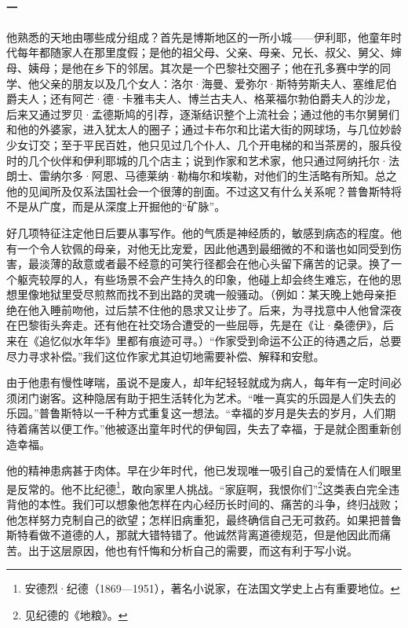 \paragraph*{一}
\par 他熟悉的天地由哪些成分组成？首先是博斯地区的一所小城——伊利耶，他童年时代每年都随家人在那里度假；是他的祖父母、父亲、母亲、兄长、叔父、舅父、婶母、姨母；是他在乡下的邻居。其次是一个巴黎社交圈子；他在孔多赛中学的同学、他父亲的朋友以及几个女人：洛尔·海曼、爱弥尔·斯特劳斯夫人、塞维尼伯爵夫人；还有阿芒·德·卡雅韦夫人、博兰古夫人、格莱福尔勃伯爵夫人的沙龙，后来又通过罗贝·孟德斯鸠的引荐，逐渐结识整个上流社会；通过他的韦尔舅舅们和他的外婆家，进入犹太人的圈子；通过卡布尔和比诺大街的网球场，与几位妙龄少女订交；至于平民百姓，他只见过几个仆人、几个开电梯的和当茶房的，服兵役时的几个伙伴和伊利耶城的几个店主；说到作家和艺术家，他只通过阿纳托尔·法朗士、雷纳尔多·阿恩、马德莱纳·勒梅尔和埃勒，对他们的生活略有所知。总之他的见闻所及仅系法国社会一个很薄的剖面。不过这又有什么关系呢？普鲁斯特将不是从广度，而是从深度上开掘他的“矿脉”。
\par 好几项特征注定他日后要从事写作。他的气质是神经质的，敏感到病态的程度。他有一个令人钦佩的母亲，对他无比宠爱，因此他遇到最细微的不和谐也如同受到伤害，最淡薄的敌意或者最不经意的可笑行径都会在他心头留下痛苦的记录。换了一个躯壳较厚的人，有些场景不会产生持久的印象，他碰上却会终生难忘，在他的思想里像地狱里受尽煎熬而找不到出路的灵魂一般骚动。（例如：某天晚上她母亲拒绝在他入睡前吻他，过后禁不住他的恳求又让步了。后来，为寻找意中人他曾深夜在巴黎街头奔走。还有他在社交场合遭受的一些屈辱，先是在《让·桑德伊》，后来在《追忆似水年华》里都有痕迹可寻。）“作家受到命运不公正的待遇之后，总要尽力寻求补偿。”我们这位作家尤其迫切地需要补偿、解释和安慰。
\par 由于他患有慢性哮喘，虽说不是废人，却年纪轻轻就成为病人，每年有一定时间必须闭门谢客。这种隐居有助于把生活转化为艺术。“唯一真实的乐园是人们失去的乐园。”普鲁斯特以一千种方式重复这一想法。“幸福的岁月是失去的岁月，人们期待着痛苦以便工作。”他被逐出童年时代的伊甸园，失去了幸福，于是就企图重新创造幸福。
\par 他的精神患病甚于肉体。早在少年时代，他已发现唯一吸引自己的爱情在人们眼里是反常的。他不比纪德\footnote{安德烈·纪德（1869—1951），著名小说家，在法国文学史上占有重要地位。}，敢向家里人挑战。“家庭啊，我恨你们”\footnote{见纪德的《地粮》。}这类表白完全违背他的本性。我们可以想象他怎样在内心经历长时间的、痛苦的斗争，终归战败；他怎样努力克制自己的欲望；怎样旧病重犯，最终确信自己无可救药。如果把普鲁斯特看做不道德的人，那就大错特错了。他诚然背离道德规范，但是他因此而痛苦。出于这层原因，他也有忏悔和分析自己的需要，而这有利于写小说。
